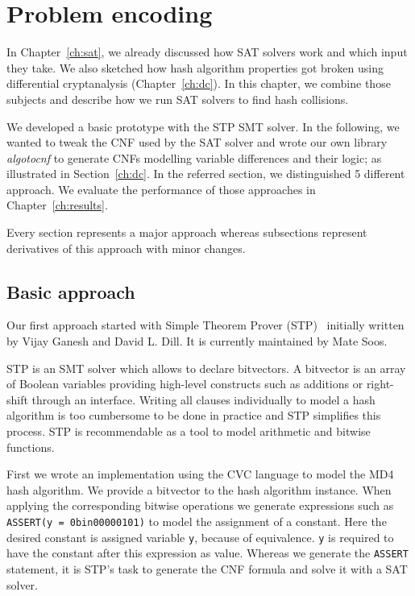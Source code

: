\renewcommand*\chappic{img/encoding.pdf}
\renewcommand*\chapquote{There is concensus that encoding techniques usually have a dramatic impact on the efficiency of the SAT solver}
\renewcommand*\chapquotesrc{Magnus Bj\"ork}
\chapter{Problem encoding}
\label{ch:enc}

In Chapter~\ref{ch:sat}, we already discussed how SAT solvers
work and which input they take. We also sketched how hash algorithm
properties got broken using differential cryptanalysis
(Chapter~\ref{ch:dc}). In this chapter, we combine those
subjects and describe how we run SAT solvers to find hash collisions.

We developed a basic prototype with the STP SMT solver. In the following,
we wanted to tweak the CNF used by the SAT solver and wrote
our own library \emph{algotocnf} to generate CNFs modelling
variable differences and their logic; as illustrated in Section~\ref{ch:dc}.
In the referred section, we distinguished 5 different approach. We evaluate
the performance of those approaches in Chapter~\ref{ch:results}.

Every section represents a major approach whereas subsections
represent derivatives of this approach with minor changes.

\section{Basic approach}
\label{sec:enc-stp}
%
Our first approach started with Simple Theorem Prover (STP)~\cite{stp}
initially written by Vijay Ganesh and David L. Dill.
It is currently maintained by Mate Soos.

STP is an SMT solver which allows to declare bitvectors. A bitvector is an array of
Boolean variables providing high-level constructs such as additions or right-shift
through an interface. Writing all clauses individually to model a hash algorithm
is too cumbersome to be done in practice and STP simplifies this process.
STP is recommendable as a tool to model arithmetic and bitwise functions.

First we wrote an implementation using the CVC language to model the MD4 hash algorithm.
We provide a bitvector to the hash algorithm instance. When applying the corresponding
bitwise operations we generate expressions such as \texttt{ASSERT(y = 0bin00000101)}
to model the assignment of a constant. Here the desired constant is assigned variable
\texttt{y}, because of equivalence. \texttt{y} is required to have the constant
after this expression as value. Whereas we generate the \texttt{ASSERT} statement,
it is STP's task to generate the CNF formula and solve it with a SAT solver.

